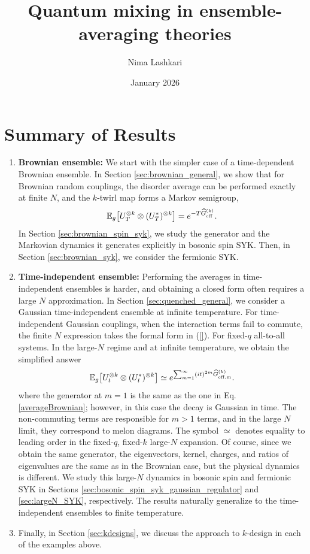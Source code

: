 \documentclass{article}
\title{Quantum mixing in ensemble-averaging theories}
\author{Nima Lashkari}
\date{January 2026}
\theoremstyle{definition}
\begin{document}
    \maketitle
    \tableofcontents

\section*{Summary of Results}

\begin{enumerate}
\item \textbf{Brownian ensemble:} We start with the simpler case of a time-dependent Brownian ensemble. 
In Section \ref{sec:brownian_general}, we show that for Brownian random couplings, the disorder average can be performed exactly
at finite $N$, and the $k$-twirl map forms a Markov semigroup,
\begin{equation}\label{averageBrownian}
    \mathbb E_g\!\left[U_T^{\otimes k}\otimes(U_T^*)^{\otimes k}\right]
    =e^{-T\widehat G_{\rm eff}^{(k)}}.
\end{equation}
In Section \ref{sec:brownian_spin_syk}, we study the generator and the Markovian dynamics it generates explicitly in bosonic spin SYK. Then, in Section \ref{sec:brownian_syk}, we consider the fermionic SYK.

\item \textbf{Time-independent ensemble:} Performing the averages in time-independent ensembles is harder, and obtaining a closed form often requires a large $N$ approximation. In Section \ref{sec:quenched_general}, we consider a Gaussian time-independent ensemble at infinite temperature.
For time-independent Gaussian couplings, when the interaction terms fail to commute, the finite $N$ expression takes the formal form in (\ref{}).
For fixed-$q$ all-to-all systems. In the large-$N$ regime and at infinite temperature, we obtain the simplified answer
\begin{equation}
    \mathbb E_g\!\left[U_t^{\otimes k}\otimes(U_t^*)^{\otimes k}\right]
    \simeq e^{\sum_{m=1}^\infty (it)^{2m}\widehat G_{\rm eff,m}^{(k)}}.
\end{equation}
where the generator at $m=1$ is the same as the one in Eq. \ref{averageBrownian}; however, in this case the decay is Gaussian in time. The non-commuting terms are responsible for $m>1$ terms, and in the large $N$ limit, they correspond to melon diagrams. The symbol $\simeq$ denotes equality to
leading order in the fixed-$q$, fixed-$k$ large-$N$ expansion. Of course, since we obtain the same generator, the eigenvectors, kernel, charges, and ratios of eigenvalues are the same as in the Brownian case, but the physical dynamics is different. We study this large-$N$ dynamics in bosonic spin and fermionic SYK in Sections \ref{sec:bosonic_spin_syk_gaussian_regulator} and \ref{sec:largeN_SYK}, respectively.
The results naturally generalize to the time-independent ensembles to finite temperature.

\item Finally, in Section \ref{sec:kdesigns}, we discuss the approach to $k$-design in each of the examples above.
\end{enumerate}
\end{document}
